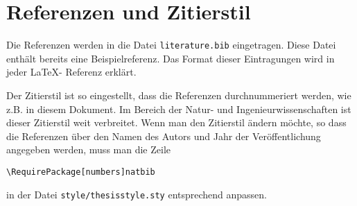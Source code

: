 %
\section{Referenzen und Zitierstil}
Die Referenzen werden in die Datei \texttt{literature.bib} eingetragen. Diese Datei
enthält bereits eine Beispielreferenz. Das Format dieser Eintragungen wird in
jeder \LaTeX - Referenz erklärt.

Der Zitierstil ist so eingestellt, dass die Referenzen durchnummeriert werden,
wie z.B. in diesem Dokument.
Im Bereich der Natur- und Ingenieurwissenschaften ist dieser Zitierstil weit
verbreitet. Wenn man den Zitierstil ändern möchte, so dass die Referenzen über
den Namen des Autors und Jahr der Veröffentlichung angegeben werden, muss man
die Zeile
\begin{center}
  \texttt{\textbackslash RequirePackage[numbers]{natbib}}
\end{center}
in der Datei \texttt{style/thesisstyle.sty} entsprechend anpassen.
